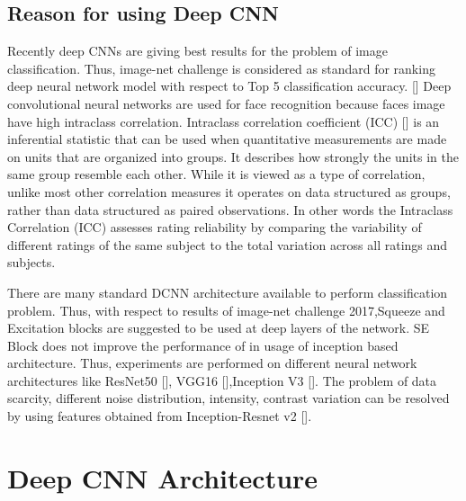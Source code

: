 \documentclass[a4paper,12pt, twoside]{NITKReport}
\begin{document}
\subsection{Reason for using Deep CNN}
\par Recently deep CNNs are giving best results for the problem of image classification. Thus, image-net challenge is considered as standard for ranking deep neural network model with respect to Top 5 classification accuracy. [\cite{NIPS2012_4824}] Deep convolutional neural networks are used for face recognition because faces image have high intraclass correlation. Intraclass correlation coefficient (ICC) [\cite{koch1982intraclass}] is an inferential statistic that can be used when quantitative measurements are made on units that are organized into groups. It describes how strongly the units in the same group resemble each other. While it is viewed as a type of correlation, unlike most other correlation measures it operates on data structured as groups, rather than data structured as paired observations. In other words the Intraclass Correlation (ICC) assesses rating reliability by comparing the variability of different ratings of the same subject to the total variation across all ratings and subjects.
\par There are many standard DCNN architecture available to perform classification problem. Thus, with respect to results of image-net challenge 2017,Squeeze and Excitation blocks are suggested to be used at deep layers of the network. SE Block does not improve the performance of in usage of inception based architecture. Thus, experiments are performed on different neural network architectures like ResNet50 [\cite{he2016deep}], VGG16 [\cite{DBLP:journals/corr/SimonyanZ14a}],Inception V3 [\cite{DBLP:journals/corr/SzegedyVISW15}]. The problem of data scarcity, different noise distribution, intensity, contrast variation can be resolved by using features obtained from Inception-Resnet v2 [\cite{DBLP:journals/corr/SzegedyIV16}].

\section{Deep CNN Architecture}
\end{document}
